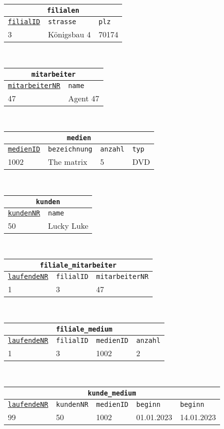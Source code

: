 \begin{Answer}[ref=TabelleErstellen1]
\begin{enumerate}
		\begin{tabular}{lll}
			\multicolumn{3}{c}{\lstinline!filialen!}\\
			\hline
			\underline{\lstinline!filialID!}&\lstinline!strasse!&\lstinline!plz!\\
			\hline
			3&Königsbau 4&70174\\
		\end{tabular}\\
		\begin{tabular}{ll}
			\multicolumn{2}{c}{\lstinline!mitarbeiter!}\\
			\hline
			\underline{\lstinline!mitarbeiterNR!}&\lstinline!name!\\
			\hline
			47&Agent 47\\
		\end{tabular}\\
		\begin{tabular}{llll}
			\multicolumn{4}{c}{\lstinline!medien!}\\
			\hline
			\underline{\lstinline!medienID!}&\lstinline!bezeichnung!&\lstinline!anzahl!&\lstinline!typ!\\
			\hline
			1002&The matrix&5&DVD\\
		\end{tabular}\\
		\begin{tabular}{ll}
			\multicolumn{2}{c}{\lstinline!kunden!}\\
			\hline
			\underline{\lstinline!kundenNR!}&\lstinline!name!\\
			\hline
			50&Lucky Luke\\
		\end{tabular}\\
		\begin{tabular}{lll}
			\multicolumn{3}{c}{\lstinline!filiale_mitarbeiter!}\\
			\hline
			\underline{\lstinline!laufendeNR!}&\lstinline!filialID!&\lstinline!mitarbeiterNR!\\
			\hline
			1&3&47\\
		\end{tabular}\\
		\begin{tabular}{llll}
			\multicolumn{4}{c}{\lstinline!filiale_medium!}\\
			\hline
			\underline{\lstinline!laufendeNR!}&\lstinline!filialID!&\lstinline!medienID!&\lstinline!anzahl!\\
			\hline
			1&3&1002&2\\
		\end{tabular}\\
		\begin{tabular}{lllll}
			\multicolumn{5}{c}{\lstinline!kunde_medium!}\\
			\hline
			\underline{\lstinline!laufendeNR!}&\lstinline!kundenNR!&\lstinline!medienID!&\lstinline!beginn!&\lstinline!beginn!\\
			\hline
			99&50&1002&01.01.2023&14.01.2023\\
		\end{tabular}
	\end{enumerate}
\end{Answer}
